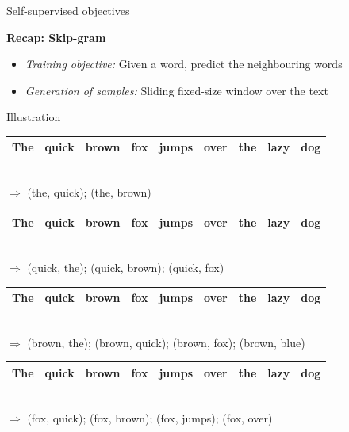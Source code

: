 \documentclass[11pt,compress,t,notes=noshow, xcolor=table]{beamer}
\begin{document}
\begin{frame}{Self-supervised objectives}

\vfill

\textbf{Recap: Skip-gram}
	
	\begin{itemize}
		\item \textit{Training objective:} Given a word, predict the neighbouring words
    \item \textit{Generation of samples:} Sliding fixed-size window over the text
	\end{itemize}
	
\begin{block}{Illustration}
\begin{tabular}{|c|c|c|cccccc|}
\hline
\cellcolor{blue!15}The & \cellcolor{blue!65}quick & \cellcolor{blue!65}brown & fox & jumps & over & the & lazy & dog \\
\hline
\end{tabular}\\
$\Rightarrow$ \quad (the, quick); (the, brown)
\begin{tabular}{|c|c|c|c|ccccc|}
\hline
\cellcolor{blue!65}The & \cellcolor{blue!15}quick & \cellcolor{blue!65}brown & \cellcolor{blue!65}fox & jumps & over & the & lazy & dog \\
\hline
\end{tabular}\\
$\Rightarrow$ \quad (quick, the); (quick, brown); (quick, fox)
\begin{tabular}{|c|c|c|c|ccccc|}
\hline
\cellcolor{blue!65}The & \cellcolor{blue!65}quick & \cellcolor{blue!15}brown & \cellcolor{blue!65}fox & \cellcolor{blue!65}jumps & over & the & lazy & dog \\
\hline
\end{tabular}\\
$\Rightarrow$ \quad (brown, the); (brown, quick); (brown, fox); (brown, blue)
\begin{tabular}{|c|c|c|c|ccccc|}
\hline
The & \cellcolor{blue!65}quick & \cellcolor{blue!65}brown & \cellcolor{blue!15}fox & \cellcolor{blue!65}jumps & \cellcolor{blue!65}over & the & lazy & dog \\
\hline
\end{tabular}\\
$\Rightarrow$ \quad (fox, quick); (fox, brown); (fox, jumps); (fox, over)
\end{block}
	
\vfill

\end{frame}
\end{document}
